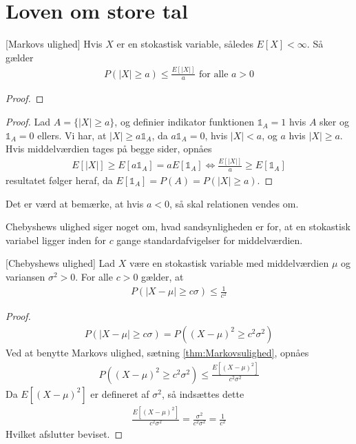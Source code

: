 \section{Loven om store tal}
\begin{thm} \label{thm:Markovsulighed}[Markovs ulighed]
Hvis $X$ er en stokastisk variable, således
$E[X] < \infty$. Så gælder
\begin{align*}
    P(|X|\geq a) \leq \frac{E[|X|]}{a} \text{ for alle } a > 0
\end{align*}
\end{thm}
\begin{proof}
\end{proof}
\begin{proof}
  Lad $A=\{|X|\geq a\}$, og definier indikator funktionen $\mathbb{1}_A = 1$ hvis $A$ sker og $\mathbb{1}_{A} = 0$ ellers. Vi har, at $|X| \geq a\mathbb{1}_{A}$, da $a\mathbb{1}_{A} = 0$, hvis $|X| < a$, og $a$ hvis $|X| \geq a$. Hvis middelværdien tages på begge sider, opnåes
  \begin{align*}
    E[|X|]\geq E[a\mathbb{1}_{A}] = a E[\mathbb{1}_A] \iff \frac{E[|X|]}{a}\geq E[\mathbb{1}_A]
  \end{align*}
  resultatet følger heraf, da $E[\mathbb{1}_{A}] = P(A) = P(|X| \geq a)$.
\end{proof}
Det er værd at bemærke, at hvis $a<0$, så skal relationen vendes om.

Chebyshews ulighed siger noget om, hvad sandsynligheden er for, at en stokastisk variabel ligger inden for $c$ gange standardafvigelser for middelværdien.
\begin{thm} \label{Thm:Chebyshewsulighed}[Chebyshews ulighed]
    Lad $X$ være en stokastisk variable med middelværdien $\mu$ og variansen $\sigma^2>0$. For alle $c>0$ gælder, at
    \begin{align*}
        P(|X-\mu|\geq c \sigma)\leq \frac{1}{c^2}
    \end{align*}
\end{thm}
\begin{proof}%
    \begin{align*}
        P(|X-\mu|\geq c \sigma)=P((X-\mu)^2\geq c^2\sigma^2)
    \end{align*}
Ved at benytte Markovs ulighed, sætning \ref{thm:Markovsulighed}, opnåes
\begin{align*}
    P((X-\mu)^2\geq c^2\sigma^2) \leq \frac{E[(X-\mu)^2]}{c^2\sigma^2}
\end{align*}
Da $E[(X-\mu)^2]$ er defineret af $\sigma^2$, så indsættes dette
\begin{align*}
    \frac{E[(X-\mu)^2]}{c^2\sigma^2} = \frac{\sigma^2}{c^2\sigma^2} = \frac{1}{c^2}
\end{align*}
Hvilket afslutter beviset.
\end{proof}

